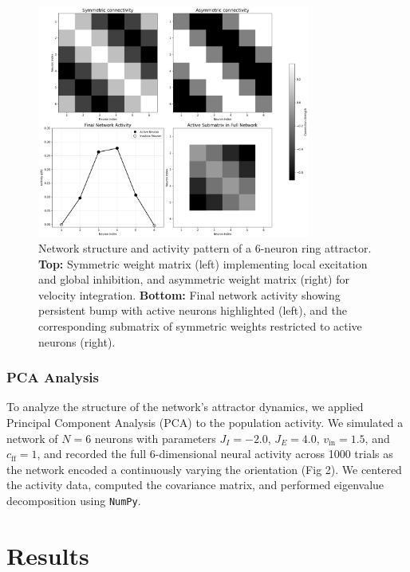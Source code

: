 \documentclass[11pt,a4paper]{article}
\begin{document}
\begin{figure}[htbp]
    \centering
    \includegraphics[width=0.8\textwidth]{connectivity_and_activity.png}
    \caption{Network structure and activity pattern of a 6-neuron ring attractor. \textbf{Top:} Symmetric weight matrix (left) implementing local excitation and global inhibition, and asymmetric weight matrix (right) for velocity integration. \textbf{Bottom:} Final network activity showing persistent bump with active neurons highlighted (left), and the corresponding submatrix of symmetric weights restricted to active neurons (right).}
    \label{fig:network_structure}
\end{figure}


\subsubsection*{PCA Analysis}

To analyze the structure of the network’s attractor dynamics, we applied Principal Component Analysis (PCA) to the population activity. We simulated a network of $N = 6$ neurons with parameters $J_I = -2.0$, $J_E = 4.0$, $v_{\text{in}} = 1.5$, and $c_{\text{ff}} = 1$, and recorded the full 6-dimensional neural activity across 1000 trials as the network encoded a continuously varying the orientation (Fig 2). 
We centered the activity data, computed the covariance matrix, and performed eigenvalue decomposition using \texttt{NumPy}. 



\section{Results}
\end{document}

